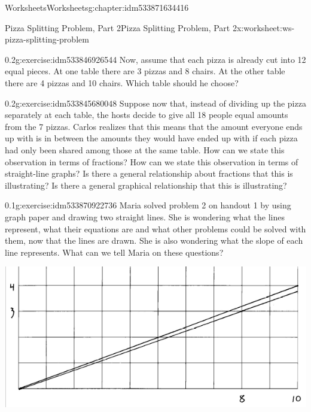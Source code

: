 \documentclass[twoside,11pt,]{book}
\begin{document}
\begin{chapterptx}{Worksheets}{}{Worksheets}{}{}{g:chapter:idm533871634416}
\begin{worksheet-section-numberless}{Pizza Splitting Problem, Part 2}{}{Pizza Splitting Problem, Part 2}{}{}{x:worksheet:ws-pizza-splitting-problem}
\begin{divisionexercise}{1}{}{0.2}{g:exercise:idm533846926544}%
Now, assume that each pizza is already cut into 12 equal pieces. At one table there are 3 pizzas and 8 chairs.  At the other table there are 4 pizzas and 10 chairs.  Which table should he choose?%
\end{divisionexercise}%
\begin{divisionexercise}{2}{}{0.2}{g:exercise:idm533845680048}%
Suppose now that, instead of dividing up the pizza separately at each table, the hosts decide to give all 18 people equal amounts from the 7 pizzas.  Carlos realizes that this means that the amount everyone ends up with is in between the amounts they would have ended up with if each pizza had only been shared among those at the same table.  How can we state this observation in terms of fractions?  How can we state this observation in terms of straight-line graphs?  Is there a general relationship about fractions that this is illustrating?  Is there a general graphical relationship that this is illustrating?%
\end{divisionexercise}%
\clearpage
\begin{divisionexercise}{3}{}{0.1}{g:exercise:idm533870922736}%
Maria solved problem 2 on handout 1 by using graph paper and drawing two straight lines.  She is wondering what the lines represent, what their equations are and what other problems could be solved with them, now that the lines are drawn.  She is also wondering what the slope of each line represents.  What can we tell Maria on these questions?%
\begin{sidebyside}{1}{0.05}{0.05}{0}%
\begin{sbspanel}{0.9}%
\includegraphics[width=1\linewidth]{images/pizza-splitting-problem.png}

\end{sbspanel}
\end{sidebyside}
\end{divisionexercise}
\end{worksheet-section-numberless}
\end{chapterptx}
\end{document}
